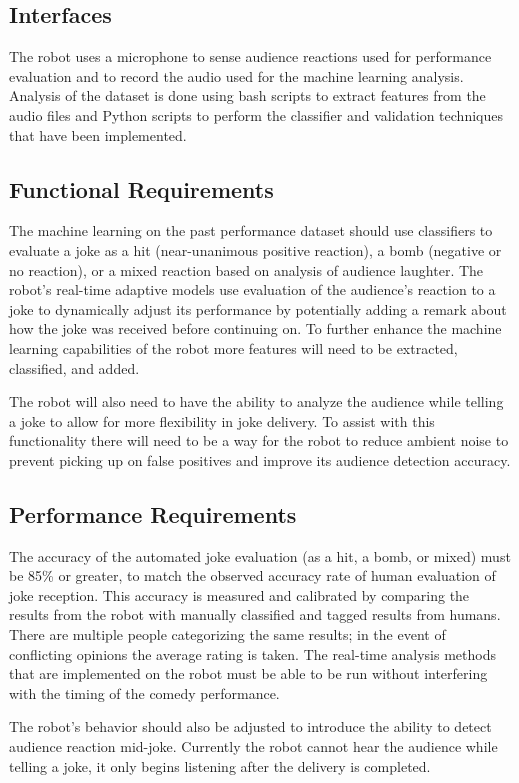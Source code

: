 \documentclass[onecolumn, draftclsnofoot,10pt, compsoc]{IEEEtran}
\begin{document}
\subsection{Interfaces}
The robot uses a microphone to sense audience reactions used for performance evaluation and to record the audio used for the machine learning analysis. Analysis of the dataset is done using bash scripts to extract features from the audio files and Python scripts to perform the classifier and validation techniques that have been implemented.
\subsection{Functional Requirements}
The machine learning on the past performance dataset should use classifiers to evaluate a joke as a hit (near-unanimous positive reaction), a bomb (negative or no reaction), or a mixed reaction based on analysis of audience laughter. The robot's real-time adaptive models use evaluation of the audience's reaction to a joke to dynamically adjust its performance by potentially adding a remark about how the joke was received before continuing on. To further enhance the machine learning capabilities of the robot more features will need to be extracted, classified, and added.\par
\vspace{.4cm}
\noindent The robot will also need to have the ability to analyze the audience while telling a joke to allow for more flexibility in joke delivery. To assist with this functionality there will need to be a way for the robot to reduce ambient noise to prevent picking up on false positives and improve its audience detection accuracy.
\subsection{Performance Requirements}
The accuracy of the automated joke evaluation (as a hit, a bomb, or mixed) must be 85\% or greater, to match the observed accuracy rate of human evaluation of joke reception. This accuracy is measured and calibrated by comparing the results from the robot with manually classified and tagged results from humans. There are multiple people categorizing the same results; in the event of conflicting opinions the average rating is taken. The real-time analysis methods that are implemented on the robot must be able to be run without interfering with the timing of the comedy performance.\par
\vspace{.4cm}
\noindent The robot's behavior should also be adjusted to introduce the ability to detect audience reaction mid-joke. Currently the robot cannot hear the audience while telling a joke, it only begins listening after the delivery is completed.
\end{document}
